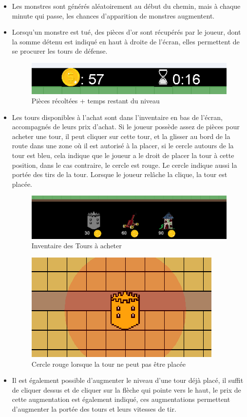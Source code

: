 \documentclass{report}
\begin{document}
\begin{itemize}
  \item Les monstres sont générés aléatoirement au début du chemin, mais à chaque minute qui passe, les chances d'apparition de monstres augmentent.
  \item Lorsqu'un monstre est tué, des pièces d'or sont récupérés par le joueur, dont la somme détenu est indiqué en haut à droite de l'écran, elles permettent de se procurer les tours de défense.
  \begin{figure}[!ht]
	\centering
	\includegraphics[scale=.8]{Pieces}
	\caption{Pièces récoltées + temps restant du niveau}
	\end{figure}
  \item Les tours disponibles à l'achat sont dans l'inventaire en bas de l'écran, accompagnés de leurs prix d'achat. Si le joueur possède assez de pièces pour acheter une tour, il peut cliquer sur cette tour, et la glisser au bord de la route dans une zone où il est autorisé à la placer, si le cercle autours de la tour est bleu, cela indique que le joueur a le droit de placer la tour à cette position, dans le cas contraire, le cercle est rouge. Le cercle indique aussi la portée des tirs de la tour. Lorsque le joueur relâche la clique, la tour est placée.
 \begin{figure}[!ht]
	\centering
	\includegraphics[scale=.7]{Inventaire}
	\caption{Inventaire des Tours à acheter}
	\end{figure}
	\begin{figure}[!ht]
	\centering
	\includegraphics[scale=.7]{MalPlacé}
	\caption{Cercle rouge lorsque la tour ne peut pas être placée}
	\end{figure}
  \item Il est également possible d'augmenter le niveau d'une tour déjà placé, il suffit de cliquer dessus et de cliquer sur la flèche qui pointe vers le haut, le prix de cette augmentation est également indiqué, ces augmentations permettent d'augmenter la portée des tours et leurs vitesses de tir.
  

\end{itemize}
\end{document}
